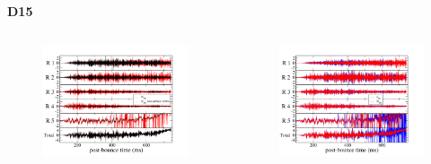 \documentclass[aspectratio=169]{beamer}
\begin{document}
\begin{frame}

  \centerline{\textbf{D15}}

  \begin{columns}[c]

    \begin{figure}
      \includegraphics[width=1.0\textwidth]{Figures/D15_N2mvsN2mbar.pdf}
    \end{figure}

    \begin{figure}
      \includegraphics[width=1.0\textwidth]{Figures/D15_N2mvsI2m.pdf}
    \end{figure}

  \end{columns}

\end{frame}
\end{document}
